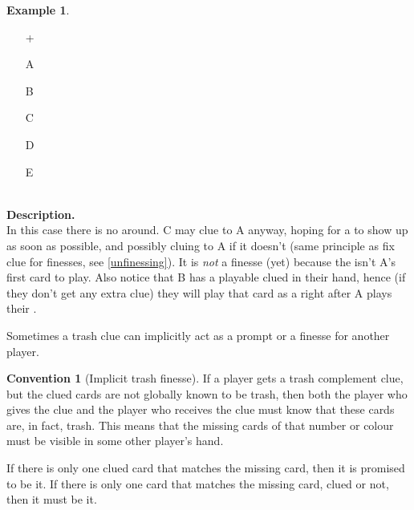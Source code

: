 \documentclass[a4paper]{article}
\theoremstyle{plain}
\theoremstyle{definition}
\newtheorem{example}[theorem]{Example}
\newtheorem{convention}[theorem]{Convention}
\begin{document}
\begin{example}	\hfill \\
	\begin{minipage}{0.45\textwidth}
		\begin{itemize}
			\item[\Large +]      
			\item[\Large A]    
			\item[\Large B]    
			\item[\Large C]    
			\item[\Large D]    
			\item[\Large E]    
		\end{itemize}
	\end{minipage}%
	\begin{minipage}{0.55\textwidth}
		\hfill \\
		
		\textbf{Description.} \\
		
		In this case there is no  around. C may clue  to A anyway, hoping for a  to show up as soon as possible, and possibly cluing  to A if it doesn't (same principle as fix clue for finesses, see \ref{unfinessing}). It is \emph{not} a finesse (yet) because the  isn't A's first card to play. Also notice that B has a playable clued  in their hand, hence (if they don't get any extra clue) they will play that card as a  right after A plays their .
	\end{minipage}
\end{example} \vspace{0.15 cm}

Sometimes a trash clue can implicitly act as a prompt or a finesse for another player.

\begin{convention}[Implicit trash finesse]
	If a player gets a trash complement clue, but the clued cards are not globally known to be trash, then both the player who gives the clue and the player who receives the clue must know that these cards are, in fact, trash. This means that the missing cards of that number or colour must be visible in some other player's hand.
	
	If there is only one clued card that matches the missing card, then it is promised to be it. If there is only one card that matches the missing card, clued or not, then it must be it.
\end{convention}
\end{document}
